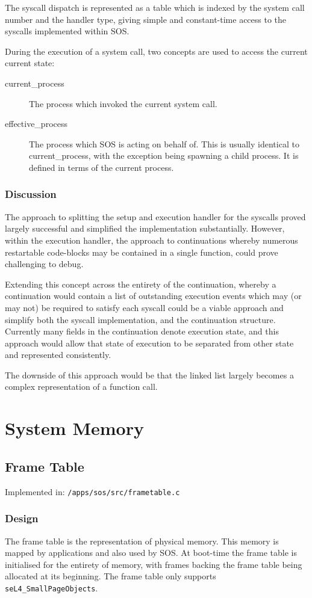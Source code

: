 \documentclass[a4paper,12pt]{article}
\begin{document}
The syscall dispatch is represented as a table which is indexed by the system
call number and the handler type, giving simple and constant-time access to
the syscalls implemented within SOS.

During the execution of a system call, two concepts are used to access the
current current state:
\begin{description}
\item[current\_process] The process which invoked the current system call.
\item[effective\_process] The process which SOS is acting on behalf of.  This
  is usually identical to current\_process, with the exception being spawning
  a child process.  It is defined in terms of the current process.
\end{description}

\subsubsection{Discussion}
The approach to splitting the setup and execution handler for the syscalls
proved largely successful and simplified the implementation substantially.  However,
within the execution handler, the approach to continuations whereby numerous
restartable code-blocks may be contained in a single function, could prove
challenging to debug.

Extending this concept across the entirety of the continuation, whereby a
continuation would contain a list of outstanding execution events which may
(or may not) be required to satisfy each syscall could be a viable approach
and simplify both the syscall implementation, and the continuation structure.
Currently many fields in the continuation denote execution state, and this
approach would allow that state of execution to be separated from other state
and represented consistently.

The downside of this approach would be that the linked list largely becomes a
complex representation of a function call.

\section{System Memory}
\subsection{Frame Table}
Implemented in: \texttt{/apps/sos/src/frametable.c}
\subsubsection{Design}
The frame table is the representation of physical memory. This memory is
mapped by applications and also used by SOS.  At boot-time the frame table is
initialised for the entirety of memory, with frames backing the frame table
being allocated at its beginning.  The frame table only supports
\texttt{seL4\_SmallPageObjects}.
\end{document}
